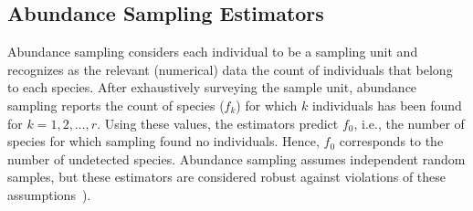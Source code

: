 \documentclass[sigconf,review,anonymous]{acmart}
\begin{document}
\subsection{Abundance Sampling Estimators}
\label{sec:estimators-abundance}
Abundance sampling considers each individual to be a sampling unit
and recognizes as the relevant (numerical) data the count of individuals
that belong to each species.
After exhaustively surveying the sample unit, abundance sampling reports
the count of species ($f_k$) for which $k$ individuals has been
found for $k=1,2,\ldots, r$.
%
Using these values, the estimators predict $f_0$, i.e., the number of species
for which sampling found no individuals. Hence, $f_0$ corresponds to the
number of undetected species.
%
Abundance sampling assumes independent random samples, but these estimators
are considered robust against violations of these assumptions~\cite{gotelli2011estimating}). 
%

\end{document}
